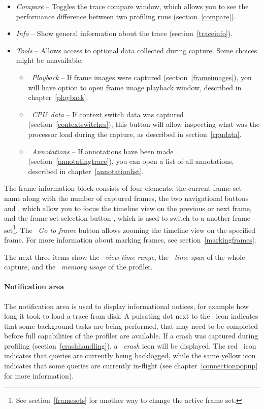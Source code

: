 \documentclass[hidelinks,titlepage,a4paper]{article}
\begin{document}
\begin{itemize}
\item \emph{\faBalanceScale{} Compare} -- Toggles the trace compare window, which allows you to see the performance difference between two profiling runs (section~\ref{compare}).
\item \emph{\faFingerprint{} Info} -- Show general information about the trace (section~\ref{traceinfo}).
\item \emph{\faTools{} Tools} -- Allows access to optional data collected during capture. Some choices might be unavailable.
\begin{itemize}
\item \emph{\faPlay{}~Playback} -- If frame images were captured (section~\ref{frameimages}), you will have option to open frame image playback window, described in chapter~\ref{playback}.
\item \emph{\faSlidersH{}~CPU~data} -- If context switch data was captured (section~\ref{contextswitches}), this button will allow inspecting what was the processor load during the capture, as described in section~\ref{cpudata}.
\item \emph{\faStickyNote{}~Annotations} -- If annotations have been made (section~\ref{annotatingtrace}), you can open a list of all annotations, described in chapter~\ref{annotationlist}.
\end{itemize}
\end{itemize}

The frame information block consists of four elements: the current frame set name along with the number of captured frames, the two navigational buttons \faCaretLeft{} and \faCaretRight{}, which allow you to focus the timeline view on the previous or next frame, and the frame set selection button \faCaretDown{}, which is used to switch to a another frame set\footnote{See section~\ref{framesets} for another way to change the active frame set.}. The \emph{\faCrosshairs{}~Go to frame} button allows zooming the timeline view on the specified frame. For more information about marking frames, see section~\ref{markingframes}.

The next three items show the \emph{\faEye{}~view time range}, the \emph{\faDatabase{}~time span} of the whole capture, and the \emph{\faMemory{}~memory usage} of the profiler.

\paragraph{Notification area}

The notification area is used to display informational notices, for example how long it took to load a trace from disk. A pulsating dot next to the \faTasks~icon indicates that some background tasks are being performed, that may need to be completed before full capabilities of the profiler are available. If a crash was captured during profiling (section~\ref{crashhandling}), a \emph{\faSkull{}~crash} icon will be displayed. The red \faTachometer*{}~icon indicates that queries are currently being backlogged, while the same yellow icon indicates that some queries are currently in-flight (see chapter~\ref{connectionpopup} for more information).
\end{document}
